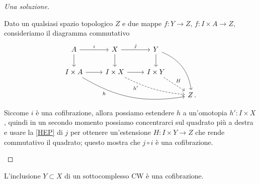 \begin{exercise}
\begin{proof}[Una soluzione]
\begin{rmnumerate}
			\item Dato un qualsiasi spazio topologico $Z$ e due mappe
			$f:Y \to Z,\, f: I \times A \to Z$, consideriamo il diagramma commutativo
			\begin{equation*}
				\begin{tikzcd}
					A \ar[r, "i"] \ar[d] & X \ar[d] \ar[r, "j"] 
					& Y \ar[d] \ar[ddr, bend left] & \\
					I \times A \ar[r] \ar[rrrd, "h"', near start, bend right=20pt] 
					& I \times X \ar[rrd, "h'"', near start, bend right=10pt, dashed] \ar[r]
					& I \times Y \ar[dr, "H", dashed] & \\
					& & & Z\,.
				\end{tikzcd}
			\end{equation*}
			Siccome $i$ è una cofibrazione, allora possiamo estendere $h$ a un'omotopia
			$h':I \times X$, quindi in un secondo momento possiamo concentrarci sul quadrato
			più a destra e usare la \eqref{HEP} di $j$ per ottenere un'estensione
			$H:I \times Y \to Z$ che rende commutativo il quadrato; questo mostra
			che $j \circ i$ è una cofibrazione.
		\end{rmnumerate}
	\end{proof}
\end{exercise}

\begin{ex}
	L'inclusione $Y \subset X$ di un sottocomplesso CW è una cofibrazione.
\end{ex}

